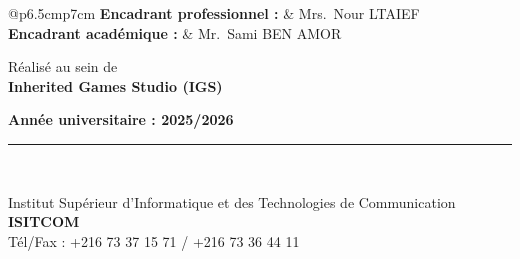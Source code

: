 \documentclass[12pt, a4paper, oneside]{report}
\begin{document}
\begin{titlepage}
\begin{tabular}{@{\hspace{1.5cm}}p{6.5cm}p{7cm}}
\textbf{Encadrant professionnel :} & Mrs.\ Nour LTAIEF \\[10pt]
\textbf{Encadrant académique :}    & Mr.\ Sami BEN AMOR \\
\end{tabular}

\vspace{18pt}

\begin{center}
Réalisé au sein de\\[6pt]
{\normalsize\bfseries Inherited Games Studio (IGS)}
\end{center}

\vspace{16pt}

\begin{center}
{\Large\color{isitTeal}\bfseries Année universitaire : 2025/2026}
\end{center}

\vfill

\noindent\rule{\linewidth}{0.5pt}\\[3pt]
\begin{center}
{\small Institut Supérieur d'Informatique et des Technologies de Communication
\quad \textbf{ISITCOM}}\\[2pt]
{\small Tél/Fax : +216 73 37 15 71 / +216 73 36 44 11}
\end{center}

\end{titlepage}
\restoregeometry

\setcounter{page}{1}




\etocstandardlines
\tableofcontents
\clearpage

\listoffigures
{}
\clearpage

\listoftables
{}
\clearpage

\end{document}

